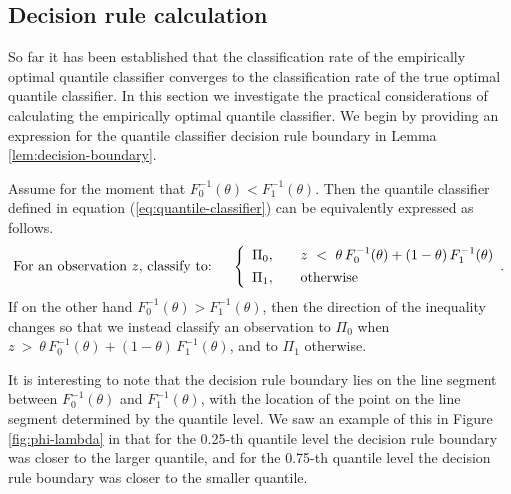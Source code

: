\subsection{Decision rule calculation}
\label{sec:empirical-quantile-classifier-results}

So far it has been established that the classification rate of the empirically
optimal quantile classifier converges to the classification rate of the true
optimal quantile classifier.  In this section we investigate the practical
considerations of calculating the empirically optimal quantile classifier.  We
begin by providing an expression for the quantile classifier decision rule
boundary in Lemma \ref{lem:decision-boundary}.

\begin{lemma}
  \label{lem:decision-boundary}
  Assume for the moment that $F_{0}^{-1}(\theta) < F_{1}^{-1}(\theta)$.  Then
  the quantile classifier defined in equation (\ref{eq:quantile-classifier}) can
  be equivalently expressed as follows.
  \begin{equation}
    \label{eq:alt-quantile-classifier-less}
    \text{For an observation $z$, classify to:} \hspace{5mm} \left\{ 
      \begin{array}{lcl}
        \Pi_{0}, & & z ~<~ \theta\, F_{0}^{-1}(\theta) +
                       (1 - \theta)\, F_{1}^{-1}(\theta) \\[1ex]
        \Pi_{1}, & & \textup{otherwise}
      \end{array} .
    \right.
  \end{equation}
  If on the other hand $F_{0}^{-1}(\theta) > F_{1}^{-1}(\theta)$, then the
  direction of the inequality changes so that we instead classify an observation
  to $\Pi_0$ when
  $z ~>~ \theta\, F_{0}^{-1}(\theta) + (1 - \theta)\, F_{1}^{-1}(\theta)$, and
  to $\Pi_1$ otherwise.
\end{lemma}

It is interesting to note that the decision rule boundary lies on the line
segment between $F_0^{-1}(\theta)$ and $F_1^{-1}(\theta)$, with the location of
the point on the line segment determined by the quantile level.  We saw an
example of this in Figure \ref{fig:phi-lambda} in that for the 0.25-th quantile
level the decision rule boundary was closer to the larger quantile, and for the
0.75-th quantile level the decision rule boundary was closer to the smaller
quantile.


